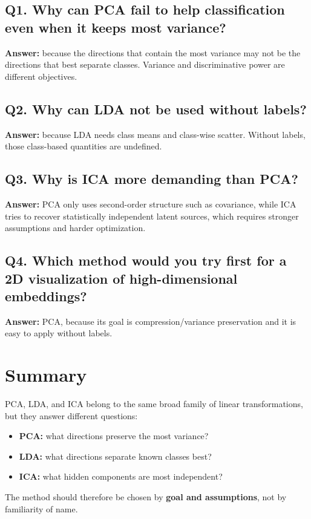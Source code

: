\documentclass[11pt]{article}
\begin{document}
\subsection*{Q1. Why can PCA fail to help classification even when it keeps most variance?}
\textbf{Answer:} because the directions that contain the most variance may not be the directions that best separate classes. Variance and discriminative power are different objectives.

\subsection*{Q2. Why can LDA not be used without labels?}
\textbf{Answer:} because LDA needs class means and class-wise scatter. Without labels, those class-based quantities are undefined.

\subsection*{Q3. Why is ICA more demanding than PCA?}
\textbf{Answer:} PCA only uses second-order structure such as covariance, while ICA tries to recover statistically independent latent sources, which requires stronger assumptions and harder optimization.

\subsection*{Q4. Which method would you try first for a 2D visualization of high-dimensional embeddings?}
\textbf{Answer:} PCA, because its goal is compression/variance preservation and it is easy to apply without labels.

\section{Summary}
PCA, LDA, and ICA belong to the same broad family of linear transformations, but they answer different questions:
\begin{itemize}[leftmargin=*]
  \item \textbf{PCA:} what directions preserve the most variance?
  \item \textbf{LDA:} what directions separate known classes best?
  \item \textbf{ICA:} what hidden components are most independent?
\end{itemize}
The method should therefore be chosen by \textbf{goal and assumptions}, not by familiarity of name.
\notesources{\AIMLMiscSources}
\end{document}
